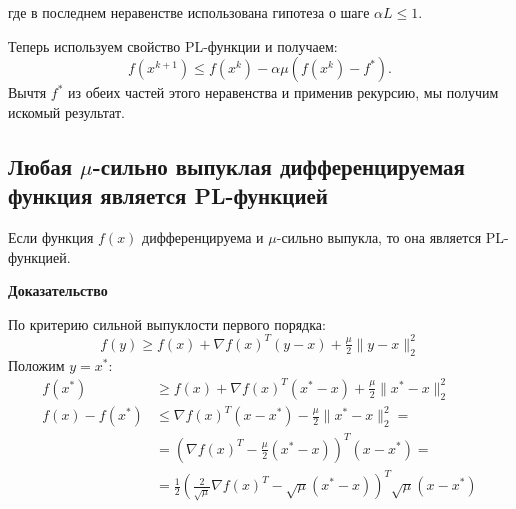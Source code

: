 \documentclass[
  russian,
  letterpaper,
  DIV=11,
  numbers=noendperiod]{scrartcl}
\begin{document}
где в последнем неравенстве использована гипотеза о шаге
\(\alpha L \leq 1\).

Теперь используем свойство PL-функции и получаем: \[
f(x^{k+1}) \leq f(x^{k}) - \alpha \mu (f(x^{k}) - f^*).
\] Вычтя \(f^*\) из обеих частей этого неравенства и применив рекурсию,
мы получим искомый результат.

\subsection{\texorpdfstring{Любая \(\mu\)-сильно выпуклая
дифференцируемая функция является
PL-функцией}{Любая \textbackslash mu-сильно выпуклая дифференцируемая функция является PL-функцией}}\label{ux43bux44eux431ux430ux44f-mu-ux441ux438ux43bux44cux43dux43e-ux432ux44bux43fux443ux43aux43bux430ux44f-ux434ux438ux444ux444ux435ux440ux435ux43dux446ux438ux440ux443ux435ux43cux430ux44f-ux444ux443ux43dux43aux446ux438ux44f-ux44fux432ux43bux44fux435ux442ux441ux44f-pl-ux444ux443ux43dux43aux446ux438ux435ux439}

\begin{tcolorbox}[enhanced jigsaw, bottomrule=.15mm, coltitle=black, opacitybacktitle=0.6, colbacktitle=quarto-callout-color!10!white, colback=white, opacityback=0, toprule=.15mm, bottomtitle=1mm, toptitle=1mm, arc=.35mm, title=\textcolor{quarto-callout-color}{\faInfo}\hspace{0.5em}{Theorem}, titlerule=0mm, rightrule=.15mm, leftrule=.75mm, left=2mm, colframe=quarto-callout-color-frame, breakable]

Если функция \(f(x)\) дифференцируема и \(\mu\)-сильно выпукла, то она
является PL-функцией.

\end{tcolorbox}

\textbf{Доказательство}

По критерию сильной выпуклости первого порядка: \[
f(y) \geq f(x) + \nabla f(x)^T(y-x) + \tfrac{\mu}{2}\|y-x\|_2^2
\] Положим \(y = x^*\): \[
\begin{split}
 f(x^*) &\geq f(x) + \nabla f(x)^T(x^*-x) + \tfrac{\mu}{2}\|x^*-x\|_2^2 \\ 
f(x) - f(x^*) &\leq \nabla f(x)^T(x-x^*) - \tfrac{\mu}{2}\|x^*-x\|_2^2 = \\ 
&= \left(\nabla f(x)^T - \tfrac{\mu}{2}(x^*-x)\right)^T (x-x^*) = \\ 
&= \frac12 \left(\tfrac{2}{\sqrt{\mu}}\nabla f(x)^T - \sqrt{\mu}(x^*-x)\right)^T \sqrt{\mu}(x-x^*)\\ 
\end{split}
\]
\end{document}
